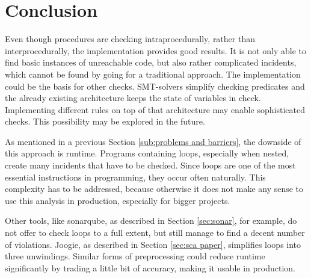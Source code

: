 
\chapter{Conclusion}
\label{cha:conclusion}

Even though procedures are checking intraprocedurally, rather than interprocedurally, the implementation provides good results. It is not only able to find basic instances of unreachable code, but also rather complicated incidents, which cannot be found by going for a traditional approach. 
The implementation could be the basis for other checks. SMT-solvers simplify checking predicates and the already existing architecture keeps the state of variables in check. 
Implementing different rules on top of that architecture may enable sophisticated checks.
This possibility may be explored in the future.


As mentioned in a previous Section \ref{sub:problems and barriers}, the downside of this approach is runtime. Programs containing loops, especially when nested, create many incidents that have to be checked. Since loops are one of the most essential instructions in programming, they occur often naturally. 
This complexity has to be addressed, because otherwise it does not make any sense to use this analysis in production, especially for bigger projects.


Other tools, like sonarqube, as described in Section \ref{sec:sonar}, for example, do not offer to check loops to a full extent, but still manage to find a decent number of violations. Joogie, as described in Section \ref{sec:sca paper}, simplifies loops into three unwindings. Similar forms of preprocessing could reduce runtime significantly by trading a little bit of accuracy, making it usable in production. 
